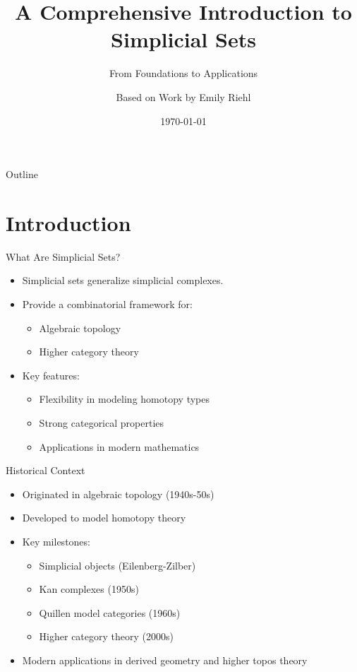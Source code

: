 \documentclass{beamer}
\title{A Comprehensive Introduction to Simplicial Sets}
\subtitle{From Foundations to Applications}
\author{Based on Work by Emily Riehl}
\date{\today}
\begin{document}
\frame{\titlepage}

\begin{frame}{Outline}
  \tableofcontents
\end{frame}

\section{Introduction}

\begin{frame}{What Are Simplicial Sets?}
  \begin{itemize}
    \item Simplicial sets generalize simplicial complexes.
    \item Provide a combinatorial framework for:
      \begin{itemize}
        \item Algebraic topology
        \item Higher category theory
      \end{itemize}
    \item Key features:
      \begin{itemize}
        \item Flexibility in modeling homotopy types
        \item Strong categorical properties
        \item Applications in modern mathematics
      \end{itemize}
  \end{itemize}
\end{frame}

\begin{frame}{Historical Context}
  \begin{itemize}
    \item Originated in algebraic topology (1940s-50s)
    \item Developed to model homotopy theory
    \item Key milestones:
      \begin{itemize}
        \item Simplicial objects (Eilenberg-Zilber)
        \item Kan complexes (1950s)
        \item Quillen model categories (1960s)
        \item Higher category theory (2000s)
      \end{itemize}
    \item Modern applications in derived geometry and higher topos theory
  \end{itemize}
\end{frame}
\end{document}

